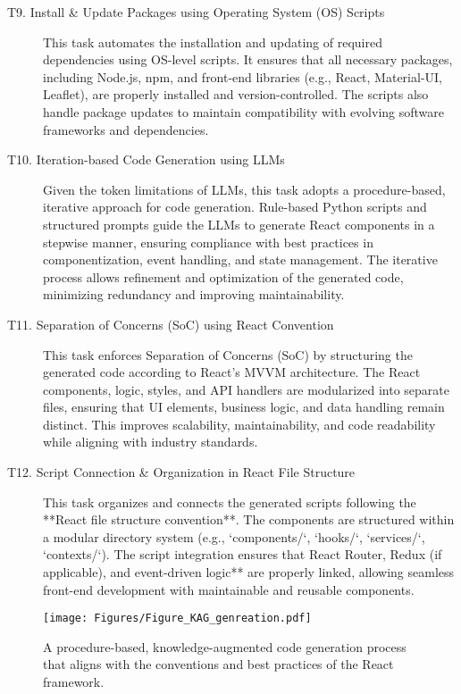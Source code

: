 \begin{description}
\begin{description}
    \item[T9. Install \& Update Packages using Operating System (OS) Scripts]  
    This task automates the installation and updating of required dependencies using OS-level scripts. It ensures that all necessary packages, including Node.js, npm, and front-end libraries (e.g., React, Material-UI, Leaflet), are properly installed and version-controlled. The scripts also handle package updates to maintain compatibility with evolving software frameworks and dependencies.

    \item[T10. Iteration-based Code Generation using LLMs]  
    Given the token limitations of LLMs, this task adopts a procedure-based, iterative approach for code generation. Rule-based Python scripts and structured prompts guide the LLMs to generate React components in a stepwise manner, ensuring compliance with best practices in componentization, event handling, and state management. The iterative process allows refinement and optimization of the generated code, minimizing redundancy and improving maintainability.

    \item[T11. Separation of Concerns (SoC) using React Convention]  
    This task enforces Separation of Concerns (SoC) by structuring the generated code according to React’s MVVM architecture. The React components, logic, styles, and API handlers are modularized into separate files, ensuring that UI elements, business logic, and data handling remain distinct. This improves scalability, maintainability, and code readability while aligning with industry standards.

    \item[T12. Script Connection \& Organization in React File Structure]  
    This task organizes and connects the generated scripts following the **React file structure convention**. The components are structured within a modular directory system (e.g., `components/`, `hooks/`, `services/`, `contexts/`). The script integration ensures that React Router, Redux (if applicable), and event-driven logic** are properly linked, allowing seamless front-end development with maintainable and reusable components.
\end{description}

\begin{figure*}[htbp]
 \centering
\texttt{[image: Figures/Figure\_KAG\_genreation.pdf]}
 \caption{A procedure-based, knowledge-augmented code generation process that aligns with the conventions and best practices of the React framework. }
 \label{fig:kag}
\end{figure*}



\end{description}
